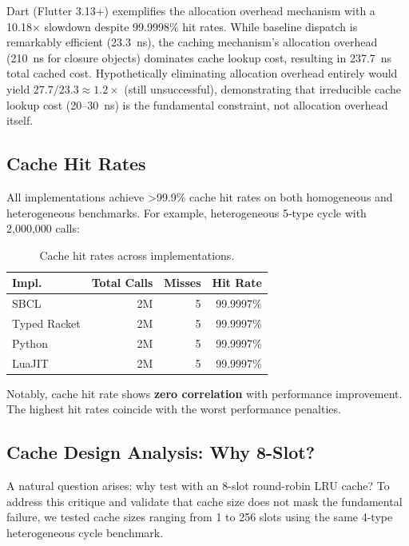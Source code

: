 \documentclass[sigplan,final,acmsmall,review,screen]{acmart}
\begin{document}
Dart (Flutter 3.13+) exemplifies the allocation overhead mechanism with a 10.18× slowdown despite 99.9998\% hit rates.
While baseline dispatch is remarkably efficient (23.3~ns), the caching mechanism's allocation overhead
(210~ns for closure objects) dominates cache lookup cost, resulting in 237.7~ns total cached cost.
Hypothetically eliminating allocation overhead entirely would yield $27.7 / 23.3 \approx 1.2\times$ (still unsuccessful), demonstrating that irreducible cache lookup cost (20--30~ns) is the fundamental constraint, not allocation overhead itself.

\subsection{Cache Hit Rates}

All implementations achieve >99.9\% cache hit rates on both homogeneous and heterogeneous
benchmarks. For example, heterogeneous 5-type cycle with 2,000,000 calls:

\begin{table}[h!]
\centering
\small
\caption{Cache hit rates across implementations.}
\label{tab:hit-rates}
\begin{tabular}{@{}lrrr@{}}
\toprule
\textbf{Impl.} & \textbf{Total Calls} & \textbf{Misses} & \textbf{Hit Rate} \\
\midrule
SBCL & 2M & 5 & 99.9997\% \\
Typed Racket & 2M & 5 & 99.9997\% \\
Python & 2M & 5 & 99.9997\% \\
LuaJIT & 2M & 5 & 99.9997\% \\
\bottomrule
\end{tabular}
\end{table}

Notably, cache hit rate shows \textbf{zero correlation} with performance improvement. The
highest hit rates coincide with the worst performance penalties.

\subsection{Cache Design Analysis: Why 8-Slot?}
\label{sec:cache-design}

A natural question arises: why test with an 8-slot round-robin LRU cache? To address this critique
and validate that cache size does not mask the fundamental failure, we tested cache sizes ranging
from 1 to 256 slots using the same 4-type heterogeneous cycle benchmark.
\end{document}
